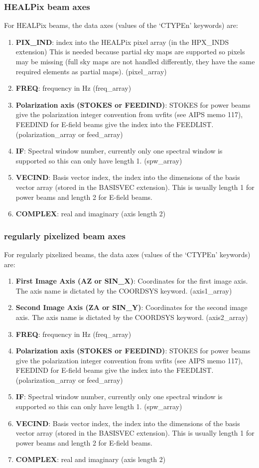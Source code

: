 \documentclass[11pt, oneside]{article}   	%
\begin{document}
\subsubsection{HEALPix beam axes}
For HEALPix beams, the data axes (values of the `CTYPEn' keywords) are: 
\begin{enumerate}
\item{\textbf{PIX\_IND}: index into the HEALPix pixel array (in the HPX\_INDS extension) This is needed because partial sky maps are supported so pixels may be missing (full sky maps are not handled differently, they have the same required elements as partial maps). (pixel\_array)}
\item{\textbf{FREQ}: frequency in Hz (freq\_array)}
\item{\textbf{Polarization axis (STOKES or FEEDIND)}: STOKES for power beams give the polarization integer convention from uvfits (see AIPS memo 117), FEEDIND for E-field beams give the index into the FEEDLIST. (polarization\_array or feed\_array)}
\item{\textbf{IF}: Spectral window number, currently only one spectral window is supported so this can only have length 1. (spw\_array)}
\item{\textbf{VECIND}: Basis vector index, the index into the dimensions of the basis vector array (stored in the BASISVEC extension). This is usually length 1 for power beams and length 2 for E-field beams.}
\item{\textbf{COMPLEX}: real and imaginary (axis length 2)}
\end{enumerate}

\subsubsection{regularly pixelized beam axes}
For regularly pixelized beams, the data axes (values of the `CTYPEn' keywords) are: 
\begin{enumerate}
\item{\textbf{First Image Axis (AZ or SIN\_X)}: Coordinates for the first image axis. The axis name is dictated by the COORDSYS keyword. (axis1\_array)}
\item{\textbf{Second Image Axis (ZA or SIN\_Y)}: Coordinates for the second image axis. The axis name is dictated by the COORDSYS keyword. (axis2\_array)}
\item{\textbf{FREQ}: frequency in Hz (freq\_array)}
\item{\textbf{Polarization axis (STOKES or FEEDIND)}: STOKES for power beams give the polarization integer convention from uvfits (see AIPS memo 117), FEEDIND for E-field beams give the index into the FEEDLIST. (polarization\_array or feed\_array)}
\item{\textbf{IF}: Spectral window number, currently only one spectral window is supported so this can only have length 1. (spw\_array)}
\item{\textbf{VECIND}: Basis vector index, the index into the dimensions of the basis vector array (stored in the BASISVEC extension). This is usually length 1 for power beams and length 2 for E-field beams.}
\item{\textbf{COMPLEX}: real and imaginary (axis length 2)}
\end{enumerate}
\end{document}
